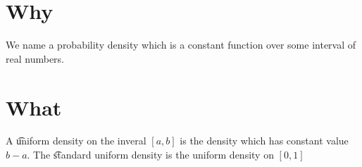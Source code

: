 
\section*{Why}

We name a probability density which is a constant function over some interval of real numbers.

\section*{What}

A \t{uniform density} on the inveral $[a, b]$ is the density which has constant value $b - a$.
The \t{standard uniform density} is the uniform density on $[0, 1]$

\blankpage